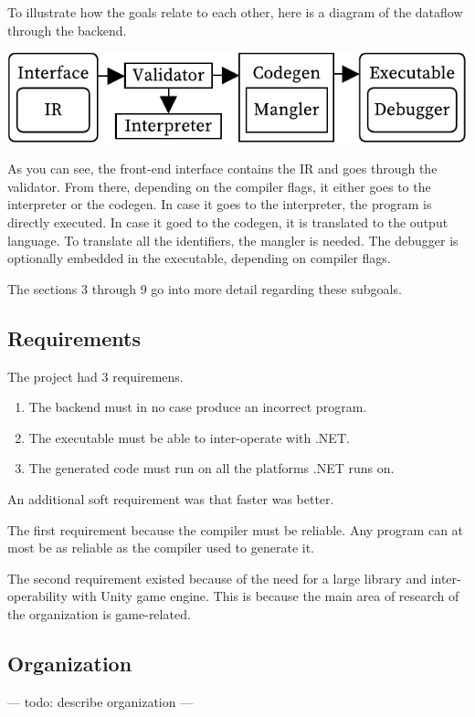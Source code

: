 To illustrate how the goals relate to each other, here is a diagram of the dataflow through the backend.

\includegraphics[width=\columnwidth]{overview}

As you can see, the front-end interface contains the IR and goes through the validator.
From there, depending on the compiler flags, it either goes to the interpreter or the codegen.
In case it goes to the interpreter, the program is directly executed.
In case it goed to the codegen, it is translated to the output language.
To translate all the identifiers, the mangler is needed.
The debugger is optionally embedded in the executable, depending on compiler flags.

The sections 3 through 9 go into more detail regarding these subgoals.

\subsection{Requirements}

The project had 3 requiremens.
\begin{enumerate}
    \item The backend must in no case produce an incorrect program.
    \item The executable must be able to inter-operate with .NET.
    \item The generated code must run on all the platforms .NET runs on.
\end{enumerate}
An additional soft requirement was that faster was better.

The first requirement  because the compiler must be reliable.
Any program can at most be as reliable as the compiler used to generate it.

\label{whydotnet}
The second requirement existed because of the need for a large library and inter-operability with Unity game engine.
This is because the main area of research of the organization is game-related.


\subsection{Organization}
--- todo: describe organization ---

